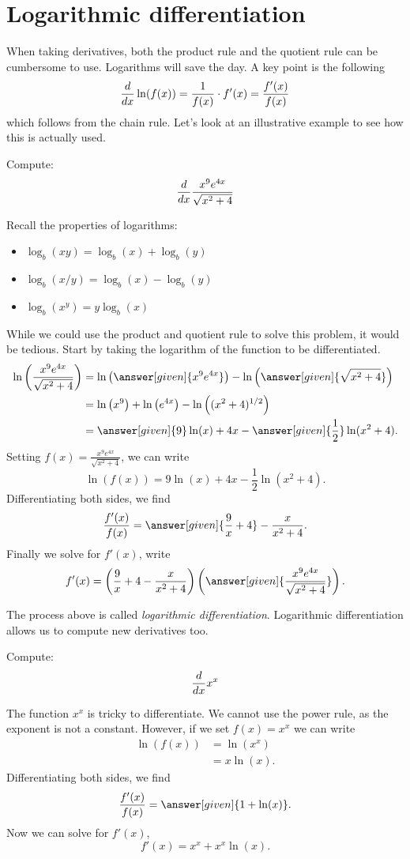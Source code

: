 \documentclass{ximera}
\begin{document}
\section{Logarithmic differentiation}


When taking derivatives, both the product rule and the quotient rule
can be cumbersome to use. Logarithms will save the day. A key point is
the following
\[
\frac{d}{\mathop{}\!d x} \ln(f(x)) = \frac{1}{f(x)}\cdot f'(x) = \frac{f'(x)}{f(x)}
\]
which follows from the chain rule. Let's look at an illustrative
example to see how this is actually used.

\begin{example} 
Compute:
\[
\frac{d}{\mathop{}\!d x} \frac{x^9e^{4x}}{\sqrt{x^2+4}}
\]

Recall the properties of logarithms:
\begin{itemize}
\item $\log_b(xy) = \log_b(x) + \log_b(y)$
\item $\log_b(x/y) = \log_b(x) - \log_b(y)$
\item $\log_b(x^y) = y\log_b(x)$
\end{itemize}

While we could use the product and quotient rule to solve this
problem, it would be tedious. Start by taking the logarithm of the
function to be differentiated.
\begin{align*}
\ln\left(\frac{x^9e^{4x}}{\sqrt{x^2+4}} \right) &= \ln\left(\answer[given]{x^9e^{4x}}\right) - \ln\left(\answer[given]{\sqrt{x^2+4}}\right)\\
&= \ln\left(x^9\right)+\ln\left(e^{4x}\right) - \ln\left((x^2+4)^{1/2}\right)\\
&= \answer[given]{9}\ln(x)+4x - \answer[given]{\frac{1}{2}}\ln(x^2+4).
\end{align*}
Setting $f(x) = \frac{x^9e^{4x}}{\sqrt{x^2+4}}$, we can write
\[
\ln(f(x)) = 9\ln(x)+4x - \frac{1}{2}\ln(x^2+4).
\]
Differentiating both sides, we find
\[
\frac{f'(x)}{f(x)} = \answer[given]{\frac{9}{x}+4} - \frac{x}{x^2+4}.
\]
Finally we solve for $f'(x)$, write
\[
f'(x) = \left(\frac{9}{x}+4 - \frac{x}{x^2+4}\right)\left(\answer[given]{\frac{x^9e^{4x}}{\sqrt{x^2+4}}}\right).
\]
\end{example}

The process above is called \textit{logarithmic
  differentiation}. Logarithmic differentiation allows us to compute
new derivatives too.

\begin{example}
Compute:
\[
\frac{d}{\mathop{}\!d x} x^x
\]
\begin{explanation}
The function $x^x$ is tricky to differentiate. We cannot use the power
rule, as the exponent is not a constant. However, if we set $f(x) = x^x$ we can write
\begin{align*}
\ln(f(x)) &= \ln\left(x^x\right)\\
&=x\ln(x).
\end{align*}
Differentiating both sides, we find
\[
\frac{f'(x)}{f(x)} = \answer[given]{1 + \ln(x)}.
\]
Now we can solve for $f'(x)$, 
\[
f'(x) = x^x + x^x\ln(x).
\]
\end{explanation}
\end{example}
\end{document}
